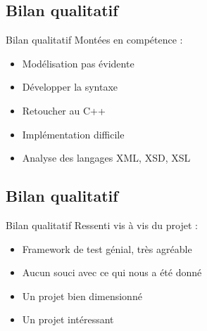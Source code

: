 \documentclass[aspectratio=169]{beamer}
\begin{document}
\subsection{Bilan qualitatif}
\begin{frame}{Bilan qualitatif}
Montées en compétence :
\begin{itemize}
 \item Modélisation pas évidente
 \item Développer la syntaxe
 \item Retoucher au C++
 \item Implémentation difficile
 \item Analyse des langages XML, XSD, XSL
\end{itemize}
\end{frame}

\subsection{Bilan qualitatif}
\begin{frame}{Bilan qualitatif}
Ressenti vis à vis du projet :
 \begin{itemize}
  \item Framework de test génial, très agréable
  \item Aucun souci avec ce qui nous a été donné
  \item Un projet bien dimensionné
  \item Un projet intéressant
 \end{itemize}
\end{frame}
\end{document}
